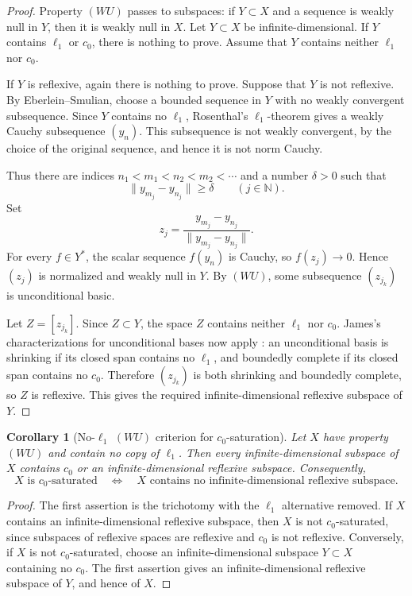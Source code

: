 \documentclass[11pt]{article}
\newtheorem*{corollary}{Corollary}
\begin{document}
\begin{proof}
Property \((WU)\) passes to subspaces: if \(Y\subset X\) and a sequence is weakly null in \(Y\), then it is weakly null in \(X\).  Let \(Y\subset X\) be infinite-dimensional.  If \(Y\) contains \(\ell_1\) or \(c_0\), there is nothing to prove.  Assume that \(Y\) contains neither \(\ell_1\) nor \(c_0\).

If \(Y\) is reflexive, again there is nothing to prove.  Suppose that \(Y\) is not reflexive.  By Eberlein--Smulian, choose a bounded sequence in \(Y\) with no weakly convergent subsequence.  Since \(Y\) contains no \(\ell_1\), Rosenthal's \(\ell_1\)-theorem \cite{RosenthalL1} gives a weakly Cauchy subsequence \((y_n)\).  This subsequence is not weakly convergent, by the choice of the original sequence, and hence it is not norm Cauchy.

Thus there are indices \(n_1<m_1<n_2<m_2<\cdots\) and a number \(\delta>0\) such that
\[
  \|y_{m_j}-y_{n_j}\|\ge \delta\qquad (j\in\mathbb N).
\]
Set
\[
  z_j=\frac{y_{m_j}-y_{n_j}}{\|y_{m_j}-y_{n_j}\|}.
\]
For every \(f\in Y^*\), the scalar sequence \(f(y_n)\) is Cauchy, so \(f(z_j)\to 0\).  Hence \((z_j)\) is normalized and weakly null in \(Y\).  By \((WU)\), some subsequence \((z_{j_k})\) is unconditional basic.

Let \(Z=[z_{j_k}]\).  Since \(Z\subset Y\), the space \(Z\) contains neither \(\ell_1\) nor \(c_0\).  James's characterizations for unconditional bases now apply \cite{JamesBases}: an unconditional basis is shrinking if its closed span contains no \(\ell_1\), and boundedly complete if its closed span contains no \(c_0\).  Therefore \((z_{j_k})\) is both shrinking and boundedly complete, so \(Z\) is reflexive.  This gives the required infinite-dimensional reflexive subspace of \(Y\).
\end{proof}

\begin{corollary}[No-\(\ell_1\) \((WU)\) criterion for \(c_0\)-saturation]
Let \(X\) have property \((WU)\) and contain no copy of \(\ell_1\).  Then every infinite-dimensional subspace of \(X\) contains \(c_0\) or an infinite-dimensional reflexive subspace.  Consequently,
\[
  X\text{ is }c_0\text{-saturated}
  \quad\Longleftrightarrow\quad
  X\text{ contains no infinite-dimensional reflexive subspace.}
\]
\end{corollary}

\begin{proof}
The first assertion is the trichotomy with the \(\ell_1\) alternative removed.  If \(X\) contains an infinite-dimensional reflexive subspace, then \(X\) is not \(c_0\)-saturated, since subspaces of reflexive spaces are reflexive and \(c_0\) is not reflexive.  Conversely, if \(X\) is not \(c_0\)-saturated, choose an infinite-dimensional subspace \(Y\subset X\) containing no \(c_0\).  The first assertion gives an infinite-dimensional reflexive subspace of \(Y\), and hence of \(X\).
\end{proof}
\end{document}
